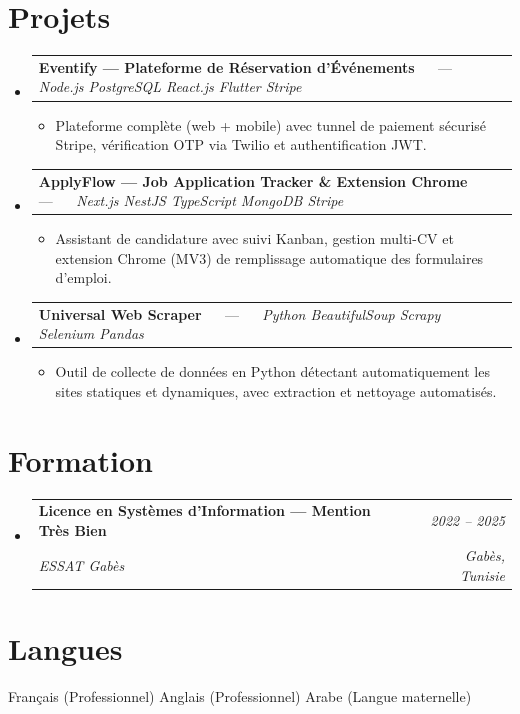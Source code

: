 \documentclass[letterpaper,9pt]{article}
\makeatletter
\newcommand{\resumeItem}[1]{\item\small{#1}}
\newcommand{\resumeSubheading}[4]{
  \vspace{-1pt}\item
  \begin{tabular*}{0.97\textwidth}[t]{l@{\extracolsep{\fill}}r}
    \textbf{#1} & \textit{\color{greytext}#2} \\
    \textit{\small\color{greytext} #3} & \textit{\small\color{greytext} #4}
  \end{tabular*}\vspace{-2pt}
}
\newcommand{\resumeProjectHeading}[2]{
  \item
  \begin{tabular*}{0.97\textwidth}{l@{\extracolsep{\fill}}r}
    \small #1 & #2
  \end{tabular*}\vspace{-1pt}
}
\newcommand{\resumeSubHeadingListStart}{\begin{itemize}[leftmargin=0.18in, label={}, itemsep=1.2pt, topsep=2.5pt, parsep=0pt]}
\newcommand{\resumeSubHeadingListEnd}{\end{itemize}\vspace{-2pt}}
\newcommand{\resumeProjectListStart}{\begin{itemize}[leftmargin=0.24in, label={}, itemsep=0.9pt, topsep=1.2pt, parsep=0pt]}
\newcommand{\resumeProjectListEnd}{\end{itemize}\vspace{-2pt}}
\makeatother
\begin{document}
\section{Projets}
\resumeSubHeadingListStart

  \resumeProjectHeading{\textbf{Eventify --- Plateforme de Réservation d'Événements} $\quad$ --- $\quad$ \emph{\color{greytext}Node.js \textperiodcentered{} PostgreSQL \textperiodcentered{} React.js \textperiodcentered{} Flutter \textperiodcentered{} Stripe}}{}
    \resumeProjectListStart
      \resumeItem{Plateforme complète (web + mobile) avec tunnel de paiement sécurisé Stripe, vérification OTP via Twilio et authentification JWT.}
    \resumeProjectListEnd

  \resumeProjectHeading{\textbf{ApplyFlow --- Job Application Tracker \& Extension Chrome} $\quad$ --- $\quad$ \emph{\color{greytext}Next.js \textperiodcentered{} NestJS \textperiodcentered{} TypeScript \textperiodcentered{} MongoDB \textperiodcentered{} Stripe}}{}
    \resumeProjectListStart
      \resumeItem{Assistant de candidature avec suivi Kanban, gestion multi-CV et extension Chrome (MV3) de remplissage automatique des formulaires d'emploi.}
    \resumeProjectListEnd

  \resumeProjectHeading{\textbf{Universal Web Scraper} $\quad$ --- $\quad$ \emph{\color{greytext}Python \textperiodcentered{} BeautifulSoup \textperiodcentered{} Scrapy \textperiodcentered{} Selenium \textperiodcentered{} Pandas}}{}
    \resumeProjectListStart
      \resumeItem{Outil de collecte de données en Python détectant automatiquement les sites statiques et dynamiques, avec extraction et nettoyage automatisés.}
    \resumeProjectListEnd

\resumeSubHeadingListEnd\vspace{-3pt}

\section{Formation}
\resumeSubHeadingListStart
  \resumeSubheading{Licence en Systèmes d'Information --- Mention Très Bien}{2022 -- 2025}{ESSAT Gabès}{Gabès, Tunisie}
\resumeSubHeadingListEnd\vspace{-1pt}

\section{Langues}
\begin{itemize}[leftmargin=0.18in, label={}, topsep=2pt, itemsep=1pt, parsep=0pt]
\footnotesize{
  \item Français (Professionnel) \textperiodcentered{} Anglais (Professionnel) \textperiodcentered{} Arabe (Langue maternelle)
}
\end{itemize}
\end{document}
